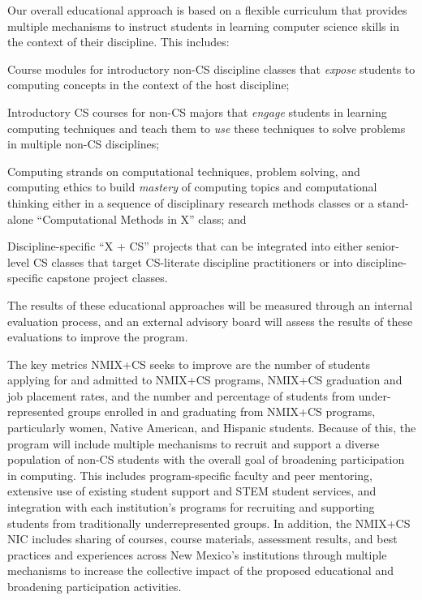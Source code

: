 Our overall educational approach %
is based on a flexible curriculum that provides multiple mechanisms to instruct students in learning computer science skills
in the context of their discipline. This includes:
\begin{tightitemize}
\item Course modules for introductory non-CS discipline classes that \emph{expose} students to computing concepts in the context of the host discipline;
\item Introductory CS courses for non-CS majors that \emph{engage} students in learning computing techniques and teach them to \emph{use} these techniques to solve problems in multiple non-CS disciplines;
\item Computing strands on computational techniques, problem solving, and computing ethics  to build \emph{mastery} of computing topics and computational thinking either in a sequence of disciplinary research methods classes or a stand-alone ``Computational Methods in X'' class; and
\item Discipline-specific ``X + CS'' projects that can be integrated into either senior-level CS classes that target CS-literate discipline practitioners or into discipline-specific capstone project classes.
\end{tightitemize}
The results of these educational approaches will be measured through an internal evaluation process, and an external advisory board will assess the results of these evaluations to improve the program.

The key metrics NMIX+CS seeks to improve  are the number of students applying for and admitted to NMIX+CS programs, NMIX+CS graduation and job placement rates, 
and the number and percentage of students from under-represented groups enrolled in and 
graduating from NMIX+CS programs, particularly women, Native American, and Hispanic students. Because of this, the program will include multiple mechanisms to recruit and support a diverse population of non-CS students with the overall goal of broadening participation in computing. This includes program-specific faculty and peer mentoring, extensive use of existing student support and STEM student services, and integration with each institution's programs for recruiting and supporting students from traditionally underrepresented groups. In addition, the NMIX+CS NIC includes sharing of courses,
course materials, assessment results, and best practices and experiences across New Mexico's institutions through multiple mechanisms to increase the collective impact of the proposed educational and broadening participation activities.


